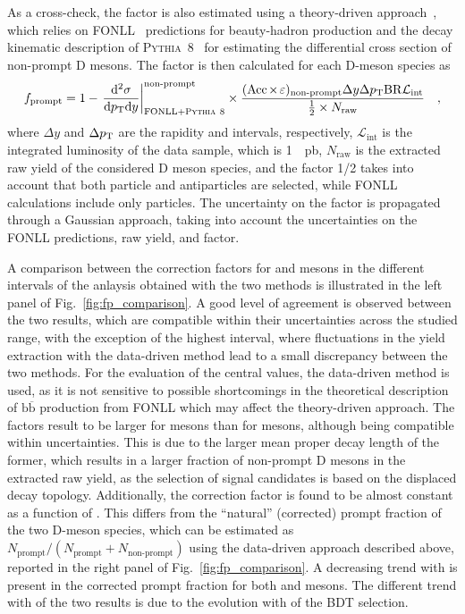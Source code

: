 As a cross-check, the \fp factor is also estimated using a theory-driven approach~\cite{ALICE:2017olh}, which relies on FONLL~\cite{Cacciari:1998it} predictions for beauty-hadron production and the decay kinematic description of \textsc{Pythia~8}~\cite{Bierlich:2022pfr} for estimating the \pt differential cross section of non-prompt D mesons. The \fp factor is then calculated for each D-meson species as 
\begin{equation*}
    f_\mathrm{prompt} = 1-\left.\frac{\mathrm{d}^2\sigma}{\mathrm{d}p_\mathrm{T}\mathrm{d} y}\right\vert_\mathrm{FONLL+\textsc{Pythia}~8}^\mathrm{non\text{-}prompt}\times\frac{(\mathrm{Acc}\mkern-2mu\times\mkern-2mu\varepsilon)_\mathrm{non\text{-}prompt} \Delta y \Delta p_\mathrm{T} \mathrm{BR} \mathcal{L}_\mathrm{int}}{\frac{1}{2}\times N_\mathrm{raw} }\quad ,
\end{equation*}
where $\Delta y$ and $\Delta p_\mathrm{T}$ are the rapidity and \pt intervals, respectively, $\mathcal{L}_\mathrm{int}$ is the integrated luminosity of the data sample, which is \SI{1}{\per\pico\barn}, $N_\mathrm{raw}$ is the extracted raw yield of the considered D meson species, and the factor 1/2 takes into account that both particle and antiparticles are selected, while FONLL calculations include only particles. The uncertainty on the \fp factor is propagated through a Gaussian approach, taking into account the uncertainties on the FONLL predictions, raw yield, and \aeffnp factor. 

A comparison between the \fp correction factors for \ds and \dpl mesons in the different \pt intervals of the anlaysis obtained with the two methods is illustrated in the left panel of Fig.~\ref{fig:fp_comparison}. A good level of agreement is observed between the two results, which are compatible within their uncertainties across the studied \pt range, with the exception of the highest \pt interval, where fluctuations in the yield extraction with the data-driven method lead to a small discrepancy between the two methods. For the evaluation of the central \fp values, the data-driven method is used, as it is not sensitive to possible shortcomings in the theoretical description of $\mathrm{b\overline{b}}$ production from FONLL which may affect the theory-driven approach. The \fp factors result to be larger for \dpl mesons than for \ds mesons, although being compatible within uncertainties. This is due to the larger mean proper decay length of the former, which results in a larger fraction of non-prompt D mesons in the extracted raw yield, as the selection of signal candidates is based on the displaced decay topology. Additionally, the \fp correction factor is found to be almost constant as a function of \pt. This differs from the ``natural'' (corrected) prompt fraction of the two D-meson species, which can be estimated as $N_\mathrm{prompt}/(N_\mathrm{prompt}+N_\mathrm{non\text{-}prompt})$ using the data-driven approach described above, reported in the right panel of Fig.~\ref{fig:fp_comparison}. A decreasing trend with \pt is present in the corrected prompt fraction for both \ds and \dpl mesons. The different trend with \pt of the two results is due to the evolution with \pt of the BDT selection.

